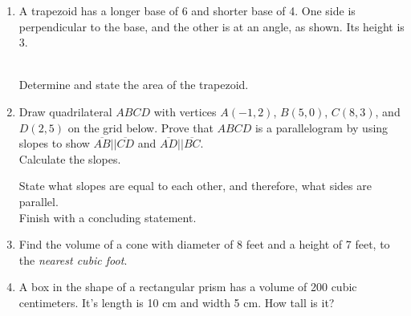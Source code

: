 \documentclass[12pt, twoside]{article}
\begin{document}
\begin{enumerate}
  \item A trapezoid has a longer base of 6 and shorter base of 4. One side is perpendicular to the base, and the other is at an angle, as shown. Its height is 3. \\[0.25cm]
     \vspace{0.25cm}\\
    Determine and state the area of the trapezoid. \vspace{4cm}

\newpage

  \item Draw quadrilateral $ABCD$ with vertices $A(-1, 2)$, $B(5,0)$, $C(8,3)$, and $D(2,5)$ on the grid below. Prove that $ABCD$ is a parallelogram by using slopes to show $\overline{AB} || \overline{CD}$ and $\overline{AD} || \overline{BC}$. \\[0.25cm]
  Calculate the slopes.
  \begin{flushright}
  \end{flushright} \vspace{3cm}
    State what slopes are equal to each other, and therefore, what sides are parallel.\\[4cm]
    Finish with a concluding statement.\\[1cm]

\newpage

  \item Find the volume of a cone with diameter of $8$ feet and a height of 7 feet, to the \emph{nearest cubic foot}. \vspace{2.5cm}

  \item A box in the shape of a rectangular prism has a volume of 200 cubic centimeters. It's length is 10 cm and width 5 cm. How tall is it? \vspace{3.0cm}


\end{enumerate}
\end{document}
